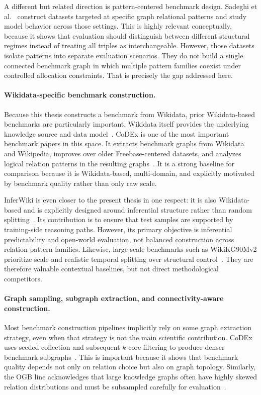 \documentclass[12pt,a4paper]{article}
\begin{document}
A different but related direction is pattern-centered benchmark design. Sadeghi et al.~\cite{sadeghi2021relational} construct datasets targeted at specific graph relational patterns and study model behavior across those settings. This is highly relevant conceptually, because it shows that evaluation should distinguish between different structural regimes instead of treating all triples as interchangeable. However, those datasets isolate patterns into separate evaluation scenarios. They do not build a single connected benchmark graph in which multiple pattern families coexist under controlled allocation constraints. That is precisely the gap addressed here.

\paragraph{Wikidata-specific benchmark construction.}
Because this thesis constructs a benchmark from Wikidata, prior Wikidata-based benchmarks are particularly important. Wikidata itself provides the underlying knowledge source and data model~\cite{vrandecic2014wikidata}. CoDEx is one of the most important benchmark papers in this space. It extracts benchmark graphs from Wikidata and Wikipedia, improves over older Freebase-centered datasets, and analyzes logical relation patterns in the resulting graphs~\cite{safavi2020codex}. It is a strong baseline for comparison because it is Wikidata-based, multi-domain, and explicitly motivated by benchmark quality rather than only raw scale.

InferWiki is even closer to the present thesis in one respect: it is also Wikidata-based and is explicitly designed around inferential structure rather than random splitting~\cite{cao2021inferwiki}. Its contribution is to ensure that test samples are supported by training-side reasoning paths. However, its primary objective is inferential predictability and open-world evaluation, not balanced construction across relation-pattern families. Likewise, large-scale benchmarks such as WikiKG90Mv2 prioritize scale and realistic temporal splitting over structural control~\cite{hu2021ogblsc,ogb_wikikg90mv2}. They are therefore valuable contextual baselines, but not direct methodological competitors.

\paragraph{Graph sampling, subgraph extraction, and connectivity-aware construction.}
Most benchmark construction pipelines implicitly rely on some graph extraction strategy, even when that strategy is not the main scientific contribution. CoDEx uses seeded collection and subsequent $k$-core filtering to produce denser benchmark subgraphs~\cite{safavi2020codex}. This is important because it shows that benchmark quality depends not only on relation choice but also on graph topology. Similarly, the OGB line acknowledges that large knowledge graphs often have highly skewed relation distributions and must be subsampled carefully for evaluation~\cite{hu2021ogblsc,ogb_wikikg90mv2}.
\end{document}

